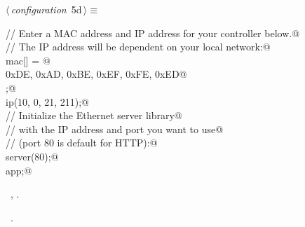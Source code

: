 \documentclass[a4paper, 12pt]{article}
\begin{document}
\begin{flushleft} \small
\begin{minipage}{\linewidth}\label{scrap7}\raggedright\small
{}$\langle\,${\itshape configuration}\nobreak\ {\footnotesize{5d}}$\,\rangle\equiv$
\vspace{-1ex}
\begin{list}{}{\setlength{\leftmargin}{1em}} \item
\mbox{}\verb@// Enter a MAC address and IP address for your controller below.@\\
\mbox{}\verb@// The IP address will be dependent on your local network:@\\
\mbox{}\verb@byte mac[] = {@\\
\mbox{}\verb@  0xDE, 0xAD, 0xBE, 0xEF, 0xFE, 0xED@\\
\mbox{}\verb@};@\\
\mbox{}\verb@IPAddress ip(10, 0, 21, 211);@\\
\mbox{}\verb@// Initialize the Ethernet server library@\\
\mbox{}\verb@// with the IP address and port you want to use@\\
\mbox{}\verb@// (port 80 is default for HTTP):@\\
\mbox{}\verb@EthernetServer server(80);@\\
\mbox{}\verb@Application app;@\\
\mbox{}{\NWsep}
\end{list}
\vspace{-1ex}
\vspace{-1ex}
\footnotesize
\begin{list}{}{\setlength{\itemsep}{-\parsep}\setlength{\itemindent}{-\leftmargin}}
\item \NWtxtMacroDefBy\ , .
\item \NWtxtMacroRefIn\ .
\end{list}
\end{minipage}
\end{flushleft}
\end{document}
